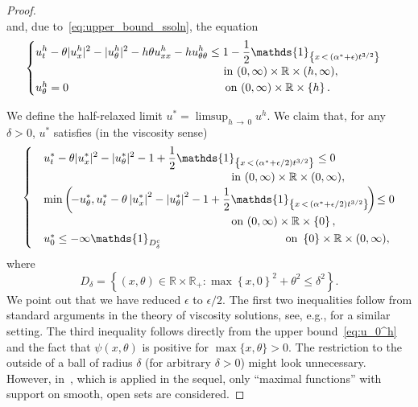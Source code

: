\documentclass[10pt]{amsart}
\theoremstyle{definition}\newtheorem{defi}[theo]{Definition}\newtheorem{rema}[theo]{Remark}\newtheorem{exam}[theo]{Example}\newtheorem{exem}[theo]{Example}\newtheorem{nota}[theo]{Notation}
\newcommand{\R}{\mathbb{R}}
\newcommand{\1}{\mathds{1}}
\newcommand{\e}{\epsilon}
\begin{document}
\begin{proof}
\begin{equation}
\end{equation}
and, due to~\eqref{eq:upper_bound_ssoln}, the equation
\begin{equation*}
\begin{cases}
\displaystyle u^h_t - \theta |u^h_x|^2 - |u^h_\theta|^2 - h \theta u^h_{xx} - h u^h_{\theta\theta} \leq 1 - \frac{1}{2}\1_{\left\{x\,<\,\left(\alpha^*+\e\right)t^{3/2}\right\}} \\
\mkern300mu \text{in } (0,\infty)\times \R \times (h,\infty),
\\
u^h_\theta = 0 \mkern250mu \text{on } (0,\infty)\times\R\times\left\{h\right\}.
\end{cases}
\end{equation*}

We define the half-relaxed limit $u^* = \limsup_{h\,\rightarrow\,0} u^h$. We claim that, for any $\delta>0$, $u^*$ satisfies (in the viscosity sense)
\begin{equation}\label{eq:half_relaxed}
\begin{cases}
&\displaystyle u^*_t - \theta |u^*_x|^2 - |u^*_\theta|^2 - 1 + \frac{1}{2}\1_{\left\{x\,<\,\left(\alpha^*+\e/2\right)t^{3/2}\right\}} \leq 0\\[0.10em]
&\mkern300mu \text{in } (0,\infty)\times\R\times(0,\infty),
\\[0.10em]
&\displaystyle\min\left(\!-u^*_\theta, u^*_t - \theta \left|u^*_x\right|^2 - \left|u^*_\theta\right|^2 - 1 + \frac{1}{2}\1_{\left\{x\,<\,\left(\alpha^*+\e/2\right)t^{3/2}\right\}}\!\right)\!\leq 0\\[0.10em]
& \mkern300mu\text{on } (0,\infty)\times\R\times\left\{0\right\},
\\[0.10em]
&u^*_0 \leq -\infty\1_{D_\delta^c} \mkern199mu\text{on } \left\{0\right\}\times \R\times(0,\infty),
\end{cases}
\end{equation}
where 
\[
D_\delta = \left\{(x,\theta) \in \R\times \R_+ : \max\left\{x,0\right\}^2 + \theta^2 \leq \delta^2\right\}.
\]
We point out that we have reduced $\e$ to $\e/2$. The first two inequalities follow from standard arguments in the theory of viscosity solutions, see, e.g., \cite[Section~3.2]{HendersonPerthameSouganidis} for a similar setting. The third inequality follows directly from the upper bound~\eqref{eq:u_0^h} and the fact that $\psi(x,\theta)$ is positive for $\max\{x,\theta\}>0$. The restriction to the outside of a ball of radius $\delta$ (for arbitrary $\delta>0$) might look unnecessary. However, in~\cite{CrandallLionsSouganidis}, which is applied in the sequel, only ``maximal functions'' with support on smooth, open sets are considered.


\end{proof}
\end{document}
